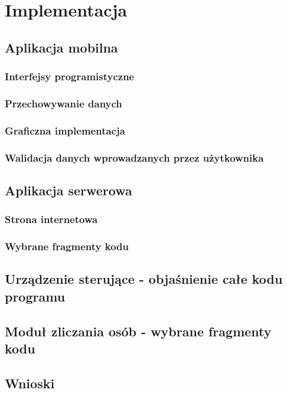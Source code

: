 \newpage\section{Implementacja} \label{sec:implementacja}
\subsection{Aplikacja mobilna}
	\subsubsection{Interfejsy programistyczne}
	\subsubsection{Przechowywanie danych}
	\subsubsection{Graficzna implementacja}
	\subsubsection{Walidacja danych wprowadzanych przez użytkownika}
\subsection{Aplikacja serwerowa}
	\subsubsection{Strona internetowa}
	\subsubsection{Wybrane fragmenty kodu}
\subsection{Urządzenie sterujące - objaśnienie całe kodu programu}
\subsection{Moduł zliczania osób - wybrane fragmenty kodu}
\subsection{Wnioski}




 
